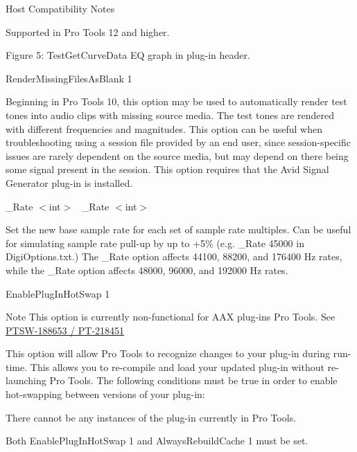 \begin{DoxyItemize}
\begin{DoxyRefDesc}{Host Compatibility Notes}
\item[\hyperlink{a00380__compatibility_notes000015}{Host Compatibility Notes}]Supported in Pro Tools 12 and higher.\end{DoxyRefDesc}


  Figure 5\+: Test\+Get\+Curve\+Data E\+Q graph in plug-\/in header.


\item  {\ttfamily Render\+Missing\+Files\+As\+Blank 1}

Beginning in Pro Tools 10, this option may be used to automatically render test tones into audio clips with missing source media. The test tones are rendered with different frequencies and magnitudes. This option can be useful when troubleshooting using a session file provided by an end user, since session-\/specific issues are rarely dependent on the source media, but may depend on there being some signal present in the session. This option requires that the Avid Signal Generator plug-\/in is installed.


\item  {\+\_\+\+Rate $<$int$>$}~\newline
 {\+\_\+\+Rate $<$int$>$}

Set the new base sample rate for each set of sample rate multiples. Can be useful for simulating sample rate pull-\/up by up to +5\% (e.\+g. {\+\_\+\+Rate 45000} in Digi\+Options.\+txt.) The {\+\_\+\+Rate} option affects 44100, 88200, and 176400 Hz rates, while the {\+\_\+\+Rate} option affects 48000, 96000, and 192000 Hz rates.


\item  {\ttfamily Enable\+Plug\+In\+Hot\+Swap 1}

\begin{DoxyNote}{Note}
This option is currently non-\/functional for A\+A\+X plug-\/ins Pro Tools. See \hyperlink{a00374_PTSW-188653}{P\+T\+S\+W-\/188653 / P\+T-\/218451}
\end{DoxyNote}
This option will allow Pro Tools to recognize changes to your plug-\/in during run-\/time. This allows you to re-\/compile and load your updated plug-\/in without re-\/launching Pro Tools. The following conditions must be true in order to enable hot-\/swapping between versions of your plug-\/in\+: 
\begin{DoxyItemize}
\item There cannot be any instances of the plug-\/in currently in Pro Tools. 
\item Both {\ttfamily Enable\+Plug\+In\+Hot\+Swap 1} and {\ttfamily Always\+Rebuild\+Cache 1} must be set. 
\end{DoxyItemize}



\end{DoxyItemize}
